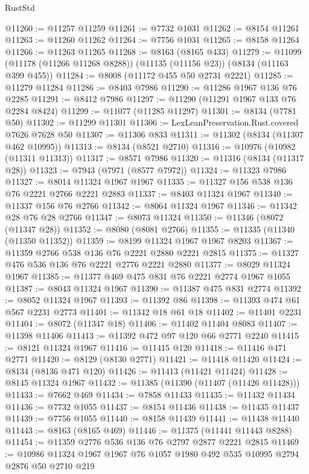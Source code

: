 \begin{lexlean}{RustStd}
\begin{coremodule}
{\begin{coremodule}
{{{{{{{{{{{{{{{{{{{{{{{{{{{{{{{{{{{{{{{{{{{{{{{{{{{{{@11260 := @11257 @11259
@11261 := @7732 @1031
@11262 := @8154 @11261
@11263 := @11260 @11262
@11264 := @7756 @1031
@11265 := @8158 @11264
@11266 := @11263 @11265
@11268 := @8163 (@8165 @433)
@11279 := @11099 (@11178 (@11266 @11268 @8288)) (@11135 (@11156 @23)) (@8134 (@11163 @399 @455))
@11284 := @8008 (@11172 @455 @50 @2731 @2221)
@11285 := @11279 @11284
@11286 := @8403 @7986
@11290 := @11286 @1967 @136 @76 @2285
@11291 := @8412 @7986
@11297 := @11290 (@11291 @1967 @133 @76 @2284 @8424)
@11299 := @11077 (@11285 @11297)
@11301 := @8134 (@7781 @50)
@11302 := @11299 @11301
@11306 := LexLeanPreservation.Rust.covered @7626 @7628 @50
@11307 := @11306 @833
@11311 := @11302 (@8134 (@11307 @462 @10995))
@11313 := @8134 (@8521 @2710)
@11316 := @10976 (@10982 (@11311 @11313))
@11317 := @8571 @7986
@11320 := @11316 (@8134 (@11317 @28))
@11323 := @7943 (@7971 (@8577 @7972))
@11324 := @11323 @7986
@11327 := @8014 @11324 @1967 @1967
@11335 := @11327 @156 @538 @136 @76 @2221 @2766 @2221 @2883
@11337 := @8403 @11324 @1967
@11340 := @11337 @156 @76 @2766
@11342 := @8064 @11324 @1967
@11346 := @11342 @28 @76 @28 @2766
@11347 := @8073 @11324
@11350 := @11346 (@8072 (@11347 @28))
@11352 := @8080 (@8081 @2766)
@11355 := @11335 (@11340 (@11350 @11352))
@11359 := @8199 @11324 @1967 @1967 @8203
@11367 := @11359 @2766 @538 @136 @76 @2221 @2880 @2221 @2815
@11375 := @11327 @476 @536 @136 @76 @2221 @2776 @2221 @2880
@11377 := @8029 @11324 @1967
@11385 := @11377 @469 @475 @831 @76 @2221 @2774 @1967 @1055
@11387 := @8043 @11324 @1967
@11390 := @11387 @475 @831 @2774
@11392 := @8052 @11324 @1967
@11393 := @11392 @86
@11398 := @11393 @474 @61 @567 @2231 @2773
@11401 := @11342 @18 @61 @18
@11402 := @11401 @2231
@11404 := @8072 (@11347 @18)
@11406 := @11402 @11404 @8083
@11407 := @11398 @11406
@11413 := @11392 @472 @97 @120 @66 @2771 @2240
@11415 := @8121 @11324 @1967
@11416 := @11415 @120
@11418 := @11416 @471 @2771
@11420 := @8129 (@8130 @2771)
@11421 := @11418 @11420
@11424 := @8134 (@8136 @471 @120)
@11426 := @11413 (@11421 @11424)
@11428 := @8145 @11324 @1967
@11432 := @11385 (@11390 (@11407 (@11426 @11428)))
@11433 := @7662 @469
@11434 := @7858 @11433
@11435 := @11432 @11434
@11436 := @7732 @1055
@11437 := @8154 @11436
@11438 := @11435 @11437
@11439 := @7756 @1055
@11440 := @8158 @11439
@11441 := @11438 @11440
@11443 := @8163 (@8165 @469)
@11446 := @11375 (@11441 @11443 @8288)
@11454 := @11359 @2776 @536 @136 @76 @2797 @2877 @2221 @2815
@11469 := @10986
    @11324
    @1967
    @1967
    @76
    @1057
    @1980
    @492
    @535
    @10995
    @2794
    @2876
    @50
    @2710
    @219
}}}}}}}}}}}}}}}}}}}}}}}}}}}}}}}}}}}}}}}}}}}}}}}}}}}}}
\end{coremodule}}
\end{coremodule}
\end{lexlean}
